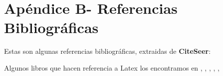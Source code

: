 \newpage
\section{Apéndice B- Referencias Bibliográficas}
\label{Apx:Apendice_B}
%

Estas son algunas referencias bibliográficas, extraidas de \textbf{CiteSeer}:

Algunos libros que hacen referencia a Latex los encontramos en \cite{kreher05pseudocode}, \cite{ohl97emp}, \cite{smith-tools}, \cite{souza-mathematical}, \cite{braams-babel}, \cite{-basic}
